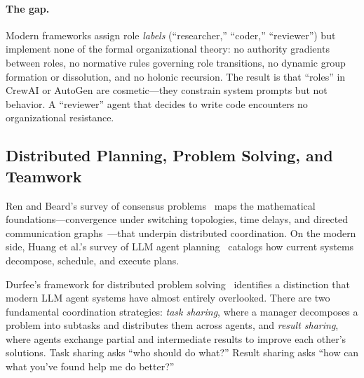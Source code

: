 \documentclass{article}
\begin{document}
\paragraph{The gap.}
Modern frameworks assign role \emph{labels} (``researcher,'' ``coder,'' ``reviewer'')
but implement none of the formal organizational theory: no authority gradients between
roles, no normative rules governing role transitions, no dynamic group formation or
dissolution, and no holonic recursion. The result is that ``roles'' in CrewAI or AutoGen
are cosmetic---they constrain system prompts but not behavior. A ``reviewer'' agent that
decides to write code encounters no organizational resistance.

\subsection{Distributed Planning, Problem Solving, and Teamwork}
\label{sec:p-dps}

%
%
%
%
%

Ren and Beard's survey of consensus problems~\citep{sutra77_survey2005} maps the
mathematical foundations---convergence under switching topologies, time delays, and
directed communication graphs~\citep{sutra38_consensus2004, sutra41_consensus2005,
sutra45_impossibility1985}---that underpin distributed coordination. On the modern
side, Huang et al.'s survey of LLM agent planning~\citep{sutra10200_understanding2024}
catalogs how current systems decompose, schedule, and execute plans.

Durfee's framework for distributed problem solving~\citep{durfee1999distributed}
identifies a distinction that modern LLM agent systems have almost entirely
overlooked. There are two fundamental coordination strategies: \emph{task sharing},
where a manager decomposes a problem into subtasks and distributes them across agents,
and \emph{result sharing}, where agents exchange partial and intermediate results to
improve each other's solutions. Task sharing asks ``who should do what?'' Result
sharing asks ``how can what you've found help me do better?''
\end{document}
